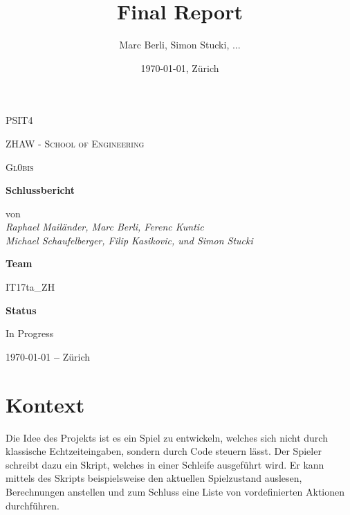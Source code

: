 \documentclass[a4paper, 11pt]{scrartcl}
\title{Final Report}
\author{Marc Berli, Simon Stucki, ...}
\date{\today{}, Zürich}
\let\oldsection\section
\renewcommand\section{\clearpage\oldsection}
\begin{document}
\begin{titlepage}
	\centering
	{\scshape\LARGE PSIT4 \par}
  \vspace{1cm}
  {\scshape ZHAW - School of Engineering\par}
	\vspace{1cm}
	{\scshape\Large Gl0bis\par}
	\vspace{1.5cm}
	{\huge\bfseries Schlussbericht\par}
	\vspace{2cm}
  von
	\vspace{1em}
  \Large\itshape \\ Raphael Mailänder, Marc Berli, Ferenc Kuntic \\ Michael Schaufelberger, Filip Kasikovic, und Simon Stucki\par
	\vfill
  \textbf{Team}\par
  IT17ta\_ZH\par
	\vspace{2em}
  \textbf{Status}\par
	In Progress

	\vfill

	{\large \today \textbf{ --} Zürich\par}
\end{titlepage}

\tableofcontents

\newpage

\section{Kontext}

Die Idee des Projekts ist es ein Spiel zu entwickeln, welches sich nicht durch klassische Echtzeiteingaben, sondern durch Code steuern lässt. Der Spieler schreibt dazu ein Skript, welches in einer Schleife ausgeführt wird. Er kann mittels des Skripts beispielsweise den aktuellen Spielzustand auslesen, Berechnungen anstellen und zum Schluss eine Liste von vordefinierten Aktionen durchführen.
\end{document}
